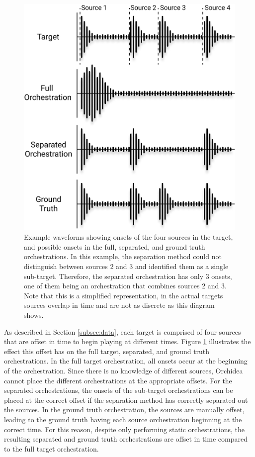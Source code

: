 \documentclass{article}
\begin{document}
		\begin{figure}[t]
		\centering
			\includegraphics[width=\columnwidth]{figures/orch.jpg}
			\caption{Example waveforms showing onsets of the four sources in the target, and possible onsets in the full, separated, and ground truth orchestrations. In this example, the separation method could not distinguish between sources 2 and 3 and identified them as a single sub-target. Therefore, the separated orchestration has only 3 onsets, one of them being an orchestration that combines sources 2 and 3. Note that this is a simplified representation, in the actual targets sources overlap in time and are not as discrete as this diagram shows.}\label{fig:orchestrations}
		\end{figure}		
		
		As described in Section \ref{subsec:data}, each target is comprised of four sources that are offset in time to begin playing at different times. Figure \ref{fig:orchestrations} illustrates the effect this offset has on the full target, separated, and ground truth orchestrations. In the full target orchestration, all onsets occur at the beginning of the orchestration. Since there is no knowledge of different sources, Orchidea cannot place the different orchestrations at the appropriate offsets. For the separated orchestrations, the onsets of the sub-target orchestrations can be placed at the correct offset if the separation method has correctly separated out the sources. In the ground truth orchestration, the sources are manually offset, leading to the ground truth having each source orchestration beginning at the correct time. For this reason, despite only performing static orchestrations, the resulting separated and ground truth orchestrations are offset in time compared to the full target orchestration.
		
\end{document}

